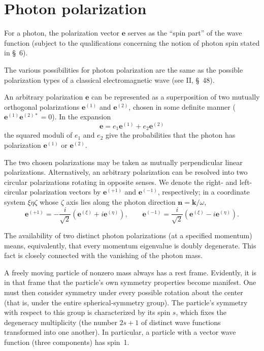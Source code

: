 
\section{Photon polarization}

For a photon, the polarization vector $\mathbf{e}$ serves as the ``spin part'' of the wave function (subject to the qualifications concerning the notion of photon spin stated in \S~6).

The various possibilities for photon polarization are the same as the possible polarization types of a classical electromagnetic wave (see II, \S~48).

An arbitrary polarization $\mathbf{e}$ can be represented as a superposition of two mutually orthogonal polarizations $\mathbf{e}^{(1)}$ and $\mathbf{e}^{(2)}$, chosen in some definite manner ($\mathbf{e}^{(1)}\mathbf{e}^{(2)*}=0$). In the expansion
\begin{equation}
\mathbf{e}=e_1\mathbf{e}^{(1)}+e_2\mathbf{e}^{(2)}
\tag{8.1}
\end{equation}
the squared moduli of $e_1$ and $e_2$ give the probabilities that the photon has polarization $\mathbf{e}^{(1)}$ or $\mathbf{e}^{(2)}$.

The two chosen polarizations may be taken as mutually perpendicular linear polarizations. Alternatively, an arbitrary polarization can be resolved into two circular polarizations rotating in opposite senses. We denote the right- and left-circular polarization vectors by $\mathbf{e}^{(+1)}$ and $\mathbf{e}^{(-1)}$, respectively; in a coordinate system $\xi\eta\zeta$ whose $\zeta$ axis lies along the photon direction $\mathbf{n}=\mathbf{k}/\omega$,
\begin{equation}
\mathbf{e}^{(+1)}=-\frac{i}{\sqrt{2}}(\mathbf{e}^{(\xi)}+i\mathbf{e}^{(\eta)}),
\qquad
\mathbf{e}^{(-1)}=\frac{i}{\sqrt{2}}(\mathbf{e}^{(\xi)}-i\mathbf{e}^{(\eta)}).
\tag{8.2}
\end{equation}

The availability of two distinct photon polarizations (at a specified momentum) means, equivalently, that every momentum eigenvalue is doubly degenerate. This fact is closely connected with the vanishing of the photon mass.

A freely moving particle of nonzero mass always has a rest frame. Evidently, it is in that frame that the particle's own symmetry properties become manifest. One must then consider symmetry under every possible rotation about the center (that is, under the entire spherical-symmetry group). The particle's symmetry with respect to this group is characterized by its spin $s$, which fixes the degeneracy multiplicity (the number $2s+1$ of distinct wave functions transformed into one another). In particular, a particle with a vector wave function (three components) has spin~1.

